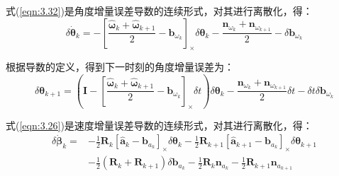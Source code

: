 式(\ref{eqn:3.32})是角度增量误差导数的连续形式，对其进行离散化，得：
\begin{equation}
\label{eqn:3.42}
\delta \dot{\bm{\theta}}_{k}=-\left[\frac{\hat{\bm{\omega}}_{k}+\hat{\bm{\omega}}_{k+1}}{2}-\mathbf{b}_{\omega_{k}}\right]_\times \delta \bm{\theta}_{k}
-\frac{\mathbf{n}_{\omega_{k}}+\mathbf{n}_{\omega_{k+1}}}{2}-\delta \mathbf{b}_{\omega_{k}}
\end{equation}

根据导数的定义，得到下一时刻的角度增量误差为：
\begin{equation}
\label{eqn:3.43}
\delta \bm{\theta}_{k+1}=\left(\mathbf{I}-\left[\frac{\hat{\bm{\omega}}_{k}+\hat{\bm{\omega}}_{k+1}}{2}-\mathbf{b}_{\omega_{k}}\right]_\times \delta t\right) \delta \bm{\theta}_{k}
- \frac{\mathbf{n}_{\omega_{k}} + \mathbf{n}_{\omega_{k+1}}}{2} \delta t
- \delta t \delta \mathbf{b}_{\omega_{k}}
\end{equation}

式(\ref{eqn:3.26})是速度增量误差导数的连续形式，对其进行离散化，得：
\begin{equation}
\label{eqn:3.44}
\begin{aligned}
\delta \dot{\bm{\beta}}_{k}= & -\frac{1}{2} \mathbf{R}_{k} \left[\hat{\mathbf{a}}_{k}- \mathbf{b}_{a_{k}}\right]_\times \delta \bm{\theta}_{k} 
- \frac{1}{2} \mathbf{R}_{k+1}\left[\hat{\mathbf{a}}_{k+1} - \mathbf{b}_{a_{k}}\right]_\times \delta \bm{\theta}_{k+1} \\
&- \frac{1}{2}\left(\mathbf{R}_{k} + \mathbf{R}_{k+1}\right) \delta \mathbf{b}_{a_{k}}
- \frac{1}{2} \mathbf{R}_{k} \mathbf{n}_{a_{k}}
-\frac{1}{2} \mathbf{R}_{k+1} \mathbf{n}_{a_{k+1}}
\end{aligned}
\end{equation}

